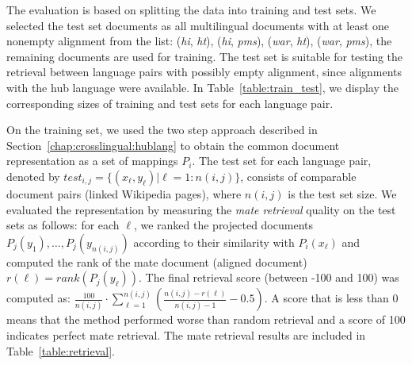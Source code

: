 The evaluation is based on splitting the data into training and test sets.
We selected the test set documents as all multilingual documents with at least one nonempty alignment
from the list: (\emph{hi}, \emph{ht}), (\emph{hi}, \emph{pms}), (\emph{war}, \emph{ht}), (\emph{war}, \emph{pms}),
the remaining documents are used for training.
The test set is suitable for testing the retrieval between language pairs with possibly empty alignment, since alignments with the hub
language were available.
In Table~\ref{table:train_test}, we display the corresponding sizes of training and test sets for each language pair.

On the training set, we used the two step approach described in Section~\ref{chap:crosslingual:hublang}
to obtain the common document representation as a set of mappings $P_i$.
The test set for each language pair, denoted by $test_{i,j} = \{(x_\ell,y_\ell) | \ell = 1:n(i,j)\} $,
consists of comparable document pairs (linked Wikipedia pages), where $n(i,j)$ is the test set size.
We evaluated the representation by measuring the \emph{mate retrieval} quality on the test sets as follows:
for each $\ell$, we ranked the projected documents $P_j(y_1),\ldots, P_j(y_{n(i,j)})$ according to
their similarity with $P_i(x_\ell)$ and computed the rank of the mate document (aligned document)
$r(\ell) = rank(P_j(y_\ell))$.
The final retrieval score (between -100 and 100) was computed as:
$\frac{100}{n(i,j)} \cdot \sum_{\ell = 1}^{n(i,j)} \left( \frac{n(i,j) - r(\ell)}{n(i,j) -1} -0.5\right)$.
A score that is less than 0 means that the method performed worse than random retrieval and a score of 100
indicates perfect mate retrieval. The mate retrieval results are included in Table~\ref{table:retrieval}.

